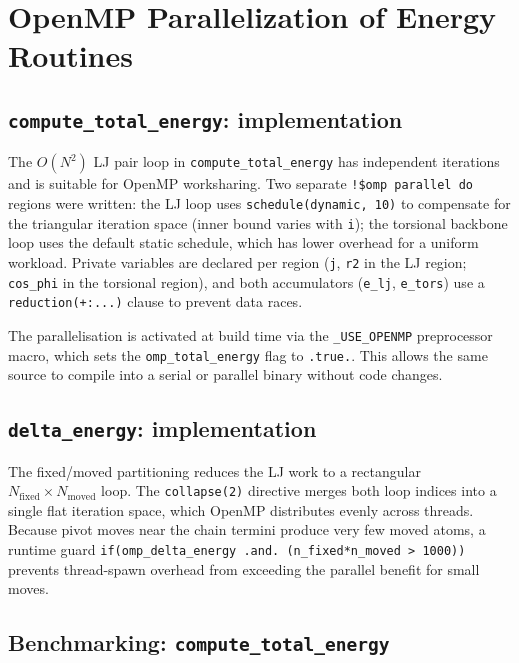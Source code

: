 
\section{OpenMP Parallelization of Energy Routines}
\label{sec:openmp}

\subsection{\texttt{compute\_total\_energy}: implementation}
 
The $O(N^2)$ LJ pair loop in \texttt{compute\_total\_energy} has
independent iterations and is suitable for OpenMP worksharing. Two
separate \texttt{!\$omp parallel do} regions were written: the LJ loop
uses \texttt{schedule(dynamic,~10)} to compensate for the triangular
iteration space (inner bound varies with \texttt{i}); the torsional
backbone loop uses the default static schedule, which has lower overhead
for a uniform workload. Private variables are declared per region
(\texttt{j}, \texttt{r2} in the LJ region; \texttt{cos\_phi} in the
torsional region), and both accumulators (\texttt{e\_lj}, \texttt{e\_tors})
use a \texttt{reduction(+:...)} clause to prevent data races.
 
The parallelisation is activated at build time via the
\texttt{\_USE\_OPENMP} preprocessor macro, which sets the
\texttt{omp\_total\_energy} flag to \texttt{.true.}. This allows the
same source to compile into a serial or parallel binary without code
changes.
 
\subsection{\texttt{delta\_energy}: implementation}
 
The fixed/moved partitioning reduces the LJ work to a rectangular
$N_\mathrm{fixed} \times N_\mathrm{moved}$ loop. The
\texttt{collapse(2)} directive merges both loop indices into a single
flat iteration space, which OpenMP distributes evenly across threads.
Because pivot moves near the chain termini produce very few moved atoms,
a runtime guard \texttt{if(omp\_delta\_energy .and.\ (n\_fixed*n\_moved > 1000))}
prevents thread-spawn overhead from exceeding the parallel benefit for
small moves.
 
\subsection{Benchmarking: \texttt{compute\_total\_energy}}
 
